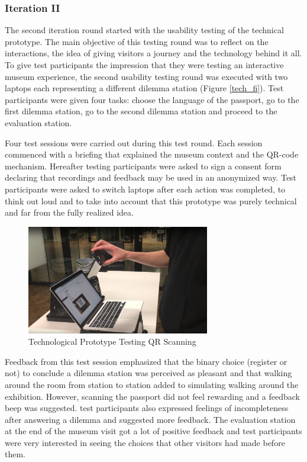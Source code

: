 \subsubsection{Iteration II}
The second iteration round started with the usability testing of the technical prototype. The main objective of this testing round was to reflect on the interactions, the idea of giving visitors a journey and the technology behind it all. To give test participants the impression that they were testing an interactive museum experience, the second usability testing round was executed with two laptops each representing a different dilemma station (Figure \ref{tech_fi}). Test participants were given four tasks: choose the language of the passport, go to the first dilemma station, go to the second dilemma station and proceed to the evaluation station.

Four test sessions were carried out during this test round. Each session commenced with a briefing that explained the museum context and the QR-code mechanism. Hereafter testing participants were asked to sign a consent form declaring that recordings and feedback may be used in an anonymized way. Test participants were asked to switch laptops after each action was completed, to think out loud and to take into account that this prototype was purely technical and far from the fully realized idea.

\begin{figure} [h]
\includegraphics[width=8cm]{assets/test_QR2.jpg}
\caption{Technological Prototype Testing QR Scanning}
\centering
\label{QR_fi}
\end{figure}

Feedback from this test session emphasized that the binary choice (register or not) to conclude a dilemma station was perceived as pleasant and that walking around the room from station to station added to simulating walking around the exhibition. However, scanning the passport did not feel rewarding and a feedback beep was suggested. test participants also expressed feelings of incompleteness after answering a dilemma and suggested more feedback. The evaluation station at the end of the museum visit got a lot of positive feedback and test participants were very interested in seeing the choices that other visitors had made before them.

